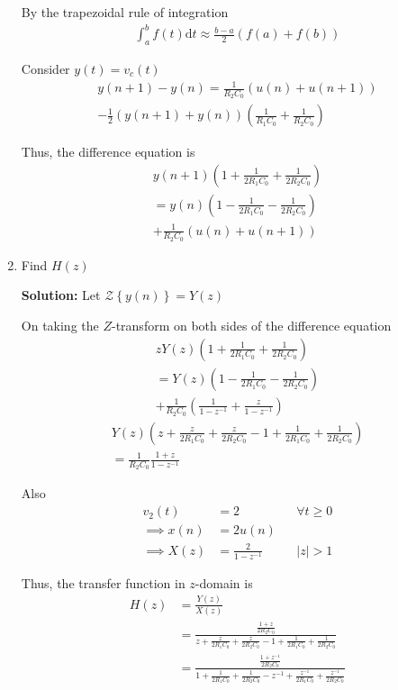 \documentclass[journal,12pt,twocolumn]{IEEEtran}
\newcommand{\solution}{\noindent \textbf{Solution: }}
\providecommand{\brak}[1]{\ensuremath{\left(#1\right)}}
\providecommand{\cbrak}[1]{\ensuremath{\left\{#1\right\}}}
\providecommand{\der}[1]{\mathrm{d} #1}
\providecommand{\abs}[1]{\left\vert#1\right\vert}
\providecommand{\z}[1]{{\mathcal{Z}}\cbrak{#1}}
\numberwithin{equation}{section}
\numberwithin{figure}{section}
\renewcommand\thesection{\arabic{section}}
\begin{document}
\begin{enumerate}[label=\thesection.\arabic*.,ref=\thesection.\theenumi]
	By the trapezoidal rule of integration
	\begin{align}
		\int_a^b f(t) \der{t} \approx \frac{b-a}{2} (f(a) + f(b))
	\end{align}
	
	Consider $y(t) = v_c(t)$
	\begin{multline}
		y(n+1) - y(n) = \frac{1}{R_2C_0}\brak{u(n)+u(n+1)} \\
		- \frac12(y(n+1) + y(n))\brak{\frac{1}{R_1C_0} + \frac{1}{R_2C_0}}
	\end{multline}
	
	Thus, the difference equation is
	\begin{multline}
		y(n+1) \brak{1 + \frac{1}{2R_1C_0} + \frac{1}{2R_2C_0}} \\= y(n) \brak{1 - \frac{1}{2R_1C_0} - \frac{1}{2R_2C_0}} \\+ \frac{1}{R_2C_0}\brak{u(n)+u(n+1)}
	\end{multline}
	
	\item Find $H(z)$
	
	\solution Let $\z{y(n)} = Y(z)$
	
	On taking the $Z$-transform on both sides of the difference equation
	\begin{multline}
		zY(z)\brak{1 + \frac{1}{2R_1C_0} + \frac{1}{2R_2C_0}} \\= Y(z)\brak{1 - \frac{1}{2R_1C_0} - \frac{1}{2R_2C_0}} \\+ \frac{1}{R_2C_0} \brak{\frac{1}{1-z^{-1}} + \frac{z}{1-z^{-1}}}
	\end{multline}
	\begin{multline}
		Y(z)\brak{z + \frac{z}{2R_1C_0} + \frac{z}{2R_2C_0} - 1 + \frac{1}{2R_1C_0} + \frac{1}{2R_2C_0}} \\
		= \frac{1}{R_2C_0} \frac{1+z}{1-z^{-1}}
	\end{multline}
	
	Also
	\begin{align}
		v_2(t) &= 2 &&\forall t \ge 0\\
		\implies x(n) &= 2u(n) \\
		\implies X(z) &= \frac{2}{1-z^{-1}} &&\abs{z} > 1
	\end{align}
	
	Thus, the transfer function in $z$-domain is
	\begin{align}
		H(z) &= \frac{Y(z)}{X(z)} \\
		&= \frac{\frac{1+z}{2R_2C_0}}{z + \frac{z}{2R_1C_0} + \frac{z}{2R_2C_0} - 1 + \frac{1}{2R_1C_0} + \frac{1}{2R_2C_0}} \\
		&= \frac{\frac{1 + z^{-1}}{2R_2C_0}}{1 + \frac{1}{2R_1C_0} + \frac{1}{2R_2C_0} - z^{-1} + \frac{z^{-1}}{2R_1C_0} + \frac{z^{-1}}{2R_2C_0}}
	\end{align}
	

\end{enumerate}
\end{document}
